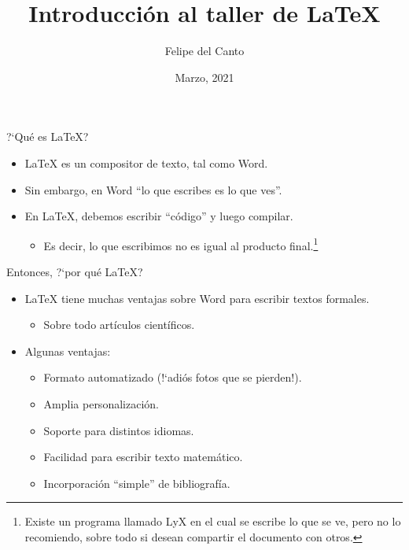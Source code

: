 \documentclass[11pt, handout]{beamer}
\title{Introducción al taller de \LaTeX}
\author{Felipe del Canto}
\date{Marzo, 2021}
\begin{document}
\frame{\titlepage}

\begin{frame}{?`Qué es \LaTeX?}
	
	\begin{itemize}
		\item {\LaTeX} es un compositor de texto, tal como Word.\pause
		\vfill
		
		\item Sin embargo, en Word ``lo que escribes es lo que ves''.\pause
		\vfill
		
		\item En \LaTeX, debemos escribir ``código'' y luego compilar.\smallskip
			\begin{itemize}
				\item Es decir, lo que escribimos no es igual al producto final.\footnote{Existe un programa llamado LyX en el cual se escribe lo que se ve, pero no lo recomiendo, sobre todo si desean compartir el documento con otros.}
			\end{itemize}

	\end{itemize}
\end{frame}

\begin{frame}{Entonces, ?`por qué \LaTeX?}
	
	\begin{itemize}
		\item {\LaTeX} tiene muchas ventajas sobre Word para escribir textos formales.\smallskip
			\begin{itemize}
				\item Sobre todo artículos científicos.\pause
			\end{itemize}
		\vfill
		
		\item Algunas ventajas:\smallskip
			\begin{itemize}
				\item Formato automatizado (!`adiós fotos que se pierden!).\smallskip
				\item Amplia personalización.\smallskip
				\item Soporte para distintos idiomas.\smallskip
				\item Facilidad para escribir texto matemático.\smallskip
				\item Incorporación ``simple'' de bibliografía.
			\end{itemize}
	\end{itemize}
\end{frame}
\end{document}
